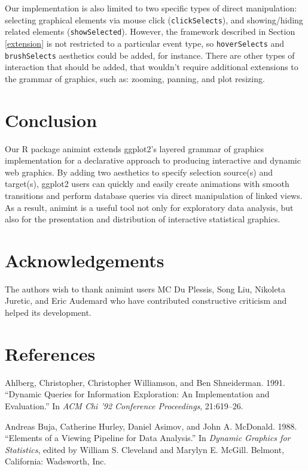 \documentclass[12pt,]{article}
\theoremstyle{definition}
\theoremstyle{definition}
\theoremstyle{remark}
\begin{document}
Our implementation is also limited to two specific types of direct
manipulation: selecting graphical elements via mouse click
(\texttt{clickSelects}), and showing/hiding related elements
(\texttt{showSelected}). However, the framework described in Section
\ref{extension} is not restricted to a particular event type, so
\texttt{hoverSelects} and \texttt{brushSelects} aesthetics could be
added, for instance. There are other types of interaction that should be
added, that wouldn't require additional extensions to the grammar of
graphics, such as: zooming, panning, and plot resizing.

\section{Conclusion}\label{conclusion}

Our R package animint extends ggplot2's layered grammar of graphics
implementation for a declarative approach to producing interactive and
dynamic web graphics. By adding two aesthetics to specify selection
source(s) and target(s), ggplot2 users can quickly and easily create
animations with smooth transitions and perform database queries via
direct manipulation of linked views. As a result, animint is a useful
tool not only for exploratory data analysis, but also for the
presentation and distribution of interactive statistical graphics.

\section*{Acknowledgements}

The authors wish to thank animint users MC Du Plessis, Song Liu,
Nikoleta Juretic, and Eric Audemard who have contributed constructive
criticism and helped its development.

\section*{References}

\hypertarget{refs}{}
\hypertarget{ref-Ahlberg:1991}{}
Ahlberg, Christopher, Christopher Williamson, and Ben Shneiderman. 1991.
``Dynamic Queries for Information Exploration: An Implementation and
Evaluation.'' In \emph{ACM Chi '92 Conference Proceedings}, 21:619--26.

\hypertarget{ref-viewing-pipeline}{}
Andreas Buja, Catherine Hurley, Daniel Asimov, and John A. McDonald.
1988. ``Elements of a Viewing Pipeline for Data Analysis.'' In
\emph{Dynamic Graphics for Statistics}, edited by William S. Cleveland
and Marylyn E. McGill. Belmont, California: Wadsworth, Inc.
\end{document}
